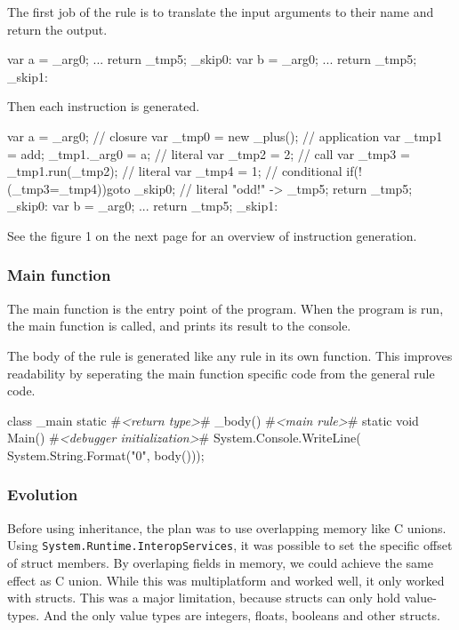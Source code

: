 The first job of the rule is to translate the input arguments to their name and return the output.

\begin{CS}
    {
        var a = _arg0; 
        ...
        return _tmp5;
    }
    _skip0:
    {
        var b = _arg0;
        ...
        return _tmp5;
    }
    _skip1:
\end{CS}

Then each instruction is generated.

\begin{CS}
    {
        var a = _arg0; 
        // closure
        var _tmp0 = new _plus(); 
        // application
        var _tmp1 = add;
        _tmp1._arg0 = a;
        // literal
        var _tmp2 = 2;
        // call
        var _tmp3 = _tmp1.run(_tmp2);
        // literal     
        var _tmp4 = 1;
        // conditional
        if(!(_tmp3=_tmp4)){goto _skip0;}
        // literal
        "odd!" -> _tmp5;
        return _tmp5;
    }
    _skip0:
    {
        var b = _arg0;
        ...
        return _tmp5;
    }
    _skip1:
\end{CS}

See the figure 1 on the next page for an overview of instruction generation.


\subsubsection{Main function}
The main function is the entry point of the program.
When the program is run, the main function is called, and prints its result to the console.

The body of the rule is generated like any rule in its own function.
This improves readability by seperating the main function specific code from the general rule code.

\begin{CS}[escapeinside=\#\#]
class _main{
    static #\textit{<return type>}# _body(){
        #\textit{<main rule>}#
    }
    static void Main(){
        #\textit{<debugger initialization>}#
        System.Console.WriteLine(
            System.String.Format("{0}", 
                                 body()));
    }
}
\end{CS}


\subsubsection{Evolution}
Before using inheritance, the plan was to use overlapping memory like C unions. 
Using \verb|System.|\verb|Runtime.|\verb|InteropServices|, it was possible to set the specific offset of struct members.
By overlaping fields in memory, we could achieve the same effect as C union.
While this was multiplatform and worked well, it only worked with structs.
This was a major limitation, because structs can only hold value-types.
And the only value types are integers, floats, booleans and other structs.

